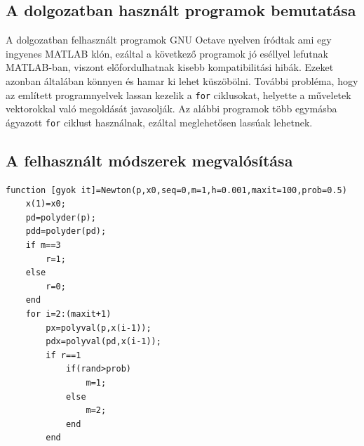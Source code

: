 \documentclass[a4paper,12pt]{report}
\begin{document}
\begin{appendices}
	\chapter{A dolgozatban használt programok bemutatása} \label{Appendix}
		A dolgozatban felhasznált programok GNU Octave nyelven íródtak ami egy ingyenes MATLAB klón, ezáltal a következő programok jó eséllyel lefutnak MATLAB-ban, viszont előfordulhatnak kisebb kompatibilitási hibák. Ezeket azonban általában könnyen és hamar ki lehet küszöbölni. További probléma, hogy az említett programnyelvek lassan kezelik a \texttt{for} ciklusokat, helyette a műveletek vektorokkal való megoldását javasolják. Az alábbi programok több egymásba ágyazott \texttt{for} ciklust használnak, ezáltal meglehetősen lassúak lehetnek.
		
		\section{A felhasznált módszerek megvalósítása} \label{Newton}
			\begin{lstlisting}[caption=Newton.m]
function [gyok it]=Newton(p,x0,seq=0,m=1,h=0.001,maxit=100,prob=0.5)
    x(1)=x0;                                                        
    pd=polyder(p);                                                  
    pdd=polyder(pd);                                                
    if m==3                                                         
        r=1;                                                        
    else                                                            
        r=0;                                                        
    end                                                             
    for i=2:(maxit+1)                                               
        px=polyval(p,x(i-1));                                       
        pdx=polyval(pd,x(i-1));                                     
        if r==1                                                     
            if(rand>prob)                                           
                m=1;                                                
            else                                                    
                m=2;                                                
            end                                                     
        end                                                         
                                                                    

\end{lstlisting}
\end{appendices}
\end{document}
